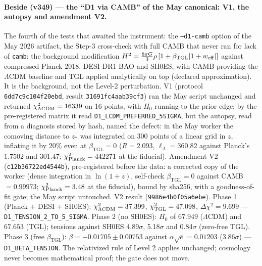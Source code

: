 \documentclass[11pt]{article}
\newcommand{\bTGL}{\beta_{\mathrm{TGL}}}\newcommand{\Msun}{M_{\odot}}\newcommand{\TGL}{\mathrm{TGL}}
\theoremstyle{definition}\newtheorem{deriv}{Derivation}
\begin{document}
\paragraph*{Beside (v349) --- the ``D1 via CAMB'' of the May canonical: V1, the autopsy and amendment V2.} The fourth of the tests that awaited the instrument: the \texttt{--d1-camb} option of the May 2026 artifact, the Step-3 cross-check with full CAMB that never ran for lack of \texttt{camb}: the background modification $H^2=\tfrac{8\pi G}{3}\rho\,[1+\bTGL|1+w_{\rm eff}|]$ against compressed Planck 2018, DESI DR1 BAO and SH0ES, with CAMB providing the $\Lambda$CDM baseline and TGL applied analytically on top (declared approximation). It is the background, not the Level-2 perturbation. V1 (protocol \texttt{6dd7c9c104f20ebd}, result \texttt{31691fc4aab39cf3}) ran the May script unchanged and returned $\chi^2_{\Lambda{\rm CDM}}=16339$ on 16 points, with $H_0$ running to the prior edge: by the pre-registered matrix it read \texttt{D1\_LCDM\_PREFERRED\_5SIGMA}, but the autopsy, read from a diagnosis stored by hash, named the defect: in the May worker the comoving distance to $z_\ast$ was integrated on 300 points of a linear grid in $z$, inflating it by 20\% even at $\bTGL=0$ ($R=2.093$, $\ell_A=360.82$ against Planck's $1.7502$ and $301.47$; $\chi^2_{\rm Planck}=442271$ at the fiducial). Amendment V2 (\texttt{c12b36722ed4544b}), pre-registered before the data: a corrected copy of the worker (dense integration in $\ln(1+z)$, self-check $\bTGL=0$ against CAMB $=0.99973$; $\chi^2_{\rm Planck}=3.48$ at the fiducial), bound by sha256, with a goodness-of-fit gate; the May script untouched. V2 result (\texttt{9986e4b0f05a6ebe}). Phase 1 (Planck + DESI + SH0ES): $\chi^2_{\Lambda{\rm CDM}}=37.399$, $\chi^2_{\rm TGL}=47.098$, $\Delta\chi^2=9.699$ --- \texttt{D1\_TENSION\_2\_TO\_5\_SIGMA}. Phase 2 (no SH0ES): $H_0$ of $67.949$ ($\Lambda$CDM) and $67.653$ (TGL); tensions against SH0ES 4.89$\sigma$, 5.18$\sigma$ and 0.84$\sigma$ (zero-free TGL). Phase 3 (free $\bTGL$): $\beta=-0.01705\pm0.00753$ against $\alpha\sqrt e=0.01203$ (3.86$\sigma$) --- \texttt{D1\_BETA\_TENSION}. The relativized rule of Level 2 applies unchanged; cosmology never becomes mathematical proof; the gate does not move.
\end{document}
